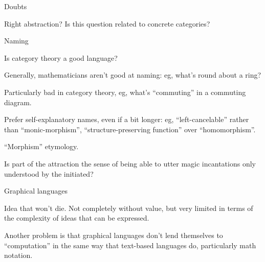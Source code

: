 \begin{plSection}{Doubts}
\begin{plSection}{Right abstraction?}
Is this question related to concrete 
categories?~\cite{wiki:ConcreteCategory}

\end{plSection}%
\begin{plSection}{Naming}
\label{sec:Naming}

Is category theory a good language?~\cite{wiki:AbstractNonsense}

Generally, mathematicians aren't good at naming:
eg, what's round about a ring?

Particularly bad in category theory, eg, 
what's ``commuting'' in a commuting diagram.

Prefer self-explanatory names, even if a bit longer:
eg, ``left-cancelable'' rather than ``monic-morphism'',
``structure-preserving function'' over ``homomorphism''.

``Morphism'' etymology.

Is part of the attraction the sense of being able to utter magic 
incantations only understood by the initiated?

 
\end{plSection}%
\begin{plSection}{Graphical languages}
\label{sec:Graphical-languages}

Idea that won't die. 
Not completely without value, 
but very limited in terms of the complexity of ideas that can be
expressed.

Another problem is that graphical languages don't lend themselves
to ``computation''
in the same way that text-based languages do,
particularly math notation.~\cite{DutilhNovaes:2012:FormalLanguages}

\end{plSection}%
\end{plSection}%
